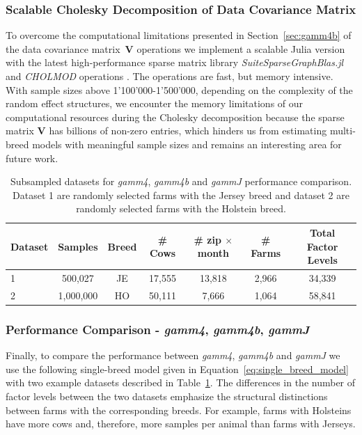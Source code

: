 \subsubsection{Scalable Cholesky Decomposition of Data Covariance Matrix}\label{sec:cholesky_scalable}
To overcome the computational limitations presented in Section~\ref{sec:gamm4b} of the data covariance matrix~$\mathbf{V}$ operations we implement a scalable Julia version with the latest high-performance sparse matrix library \textit{SuiteSparseGraphBlas.jl} \citep{GraphBLAS7, graphblas_1000, graphblas_julia} and \textit{CHOLMOD} operations \citep{davis_row_2005, davis_modifying_1999, chen_algorithm_2008, davis_dynamic_2009}. The operations are fast, but memory intensive. With sample sizes above 1'100'000-1'500'000, depending on the complexity of the random effect structures, we encounter the memory limitations of our computational resources during the Cholesky decomposition because the sparse matrix $\mathbf{V}$ has billions of non-zero entries, which hinders us from estimating multi-breed models with meaningful sample sizes and remains an interesting area for future work.

\begin{table}[H]
\centering
\begin{tabular}{lcccccc}
Dataset & Samples & Breed & \# Cows & \# zip $\times$ month & \# Farms & Total Factor Levels \\
\hline
\hline
1 & 500,027 & JE  & 17,555 & 13,818 & 2,966  & 34,339 \\
2 & 1,000,000 & HO & 50,111 & 7,666  & 1,064  & 58,841 \\
\end{tabular}
\captionsetup{width=0.9\linewidth}
\caption{Subsampled datasets for \textit{gamm4}, \textit{gamm4b} and \textit{gammJ} performance comparison. Dataset 1 are randomly selected farms with the Jersey breed and dataset 2 are randomly selected farms with the Holstein breed.}
\label{table:gamm_performance_datasets}
\end{table}

\subsubsection{Performance Comparison - \textit{gamm4}, \textit{gamm4b}, \textit{gammJ}}
Finally, to compare the performance between \textit{gamm4}, \textit{gamm4b} and \textit{gammJ} we use the following single-breed model given in Equation~\ref{eq:single_breed_model} with two example datasets described in Table~\ref{table:gamm_performance_datasets}. The differences in the number of factor levels between the two datasets emphasize the structural distinctions between farms with the corresponding breeds. For example, farms with Holsteins have more cows and, therefore, more samples per animal than farms with Jerseys.

